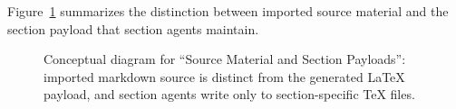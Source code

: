 Figure~\ref{fig:ch07_sec01_section_payloads} summarizes the distinction between imported source material and the section payload that section agents maintain.

\begin{figure}[htbp]
\centering

\caption{Conceptual diagram for ``Source Material and Section Payloads'': imported markdown source is distinct from the generated \LaTeX{} payload, and section agents write only to section-specific TeX files.}
\label{fig:ch07_sec01_section_payloads}
\end{figure}
